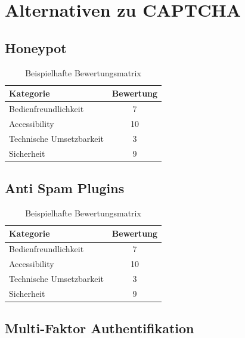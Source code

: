 \section{Alternativen zu CAPTCHA}

\subsection{Honeypot}

\begin{table}[h!]
    \caption{Beispielhafte Bewertungsmatrix}
    \begin{center}
        \begin{tabular}{l|c}
            Kategorie                       & Bewertung \\\hline
            Bedienfreundlichkeit                         & 7         \\
            Accessibility                   & 10        \\
            Technische Umsetzbarkeit        & 3         \\
            Sicherheit                      & 9         
        \end{tabular}
    \end{center}
\end{table}

\subsection{Anti Spam Plugins}

\begin{table}[h!]
    \caption{Beispielhafte Bewertungsmatrix}
    \begin{center}
        \begin{tabular}{l|c}
            Kategorie                       & Bewertung \\\hline
            Bedienfreundlichkeit                         & 7         \\
            Accessibility                   & 10        \\
            Technische Umsetzbarkeit        & 3         \\
            Sicherheit                      & 9         
        \end{tabular}
    \end{center}
\end{table}

\subsection{Multi-Faktor Authentifikation}

